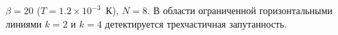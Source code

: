 $\beta = 20$ ($T = 1.2\times 10^{-3}$~К), $N=8$.
В области ограниченной горизонтальными линиями $k=2$ и $k=4$
детектируется трехчастичная запутанность.
